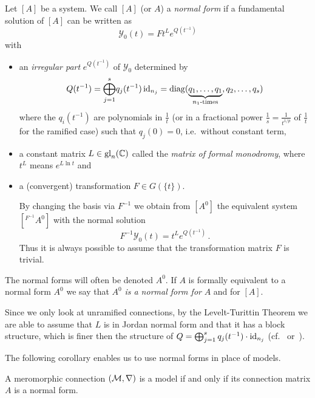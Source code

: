 \begin{defn}\label{defn:normSol}
  Let $[A]$ be a system.
  We call $[A]$ (or $A$) a \emph{normal form} if a fundamental solution of
  $[A]$ can be written as
  \[
    \mathcal{Y}_0(t)=F t^L e^{Q(t^{-1})}
  \]
  with
  \begin{itemize}
    \item an \emph{irregular part} $e^{Q(t^{-1})}$ of $\mathcal{Y}_0$
      determined by
      \[
        Q(t^{-1})=\underset{j=1}{\overset{s}{\bigoplus}}q_j(t^{-1})\id_{n_j}
          =\diag(\underset{n_1\text{-times}}{\underbrace{%
          q_1,\dots,q_1}},q_2,\dots,q_s)
      \]
      where the $q_i(t^{-1})$ are polynomials in $\frac{1}{t}$ (or in a
      fractional power $\frac{1}{s}=\frac{1}{t^{1/p}}$ of $\frac{1}{t}$ for the
      ramified case) such that $q_j(0)=0$, i.e.\ without constant term,
    \item a constant matrix $L\in\operatorname{gl}_n(\mathbb{C})$ called the \emph{matrix of formal
      monodromy}, where $t^L$ means $e^{L\ln t}$ and
    \item a (convergent) transformation $F\in G(\!\{t\}\!)$.
      \begin{s-rem}
        By changing the basis via $F^{-1}$ we obtain from $[A^0]$ the
        equivalent system $[{}^{F^{-1}}\!A^0]$ with the normal solution
        \[
          F^{-1}\mathcal{Y}_0(t)=t^L e^{Q(t^{-1})} \,.
        \]
        Thus it is always possible to assume that the transformation matrix $F$
        is trivial.
      \end{s-rem}
  \end{itemize}
  The normal forms will often be denoted $A^0$.
  If $A$ is formally equivalent to a normal form $A^0$ we say that $A^0$
  \emph{is a normal form for} $A$ and for $[A]$.
\end{defn}
\begin{cor}\label{cor:structuralAssumptions}
  Since we only look at unramified connections, by the Levelt-Turittin Theorem 
  we are able to assume that $L$ is in Jordan normal form and that it has a
  block structure, which is finer then the structure of
  $Q=\bigoplus_{j=1}^sq_j(t^{-1})\cdot\operatorname{id}_{n_j}$
  (cf.~\cite[Sec.1]{Remy2014} or~\cite[Sec.4]{Martinet1991}).
\end{cor}
The following corollary enables us to use normal forms in place of models.
\begin{cor}
  A meromorphic connection $(\mathcal{M},\nabla)$ is a model if and only if its
  connection matrix $A$ is a normal form.
\end{cor}

